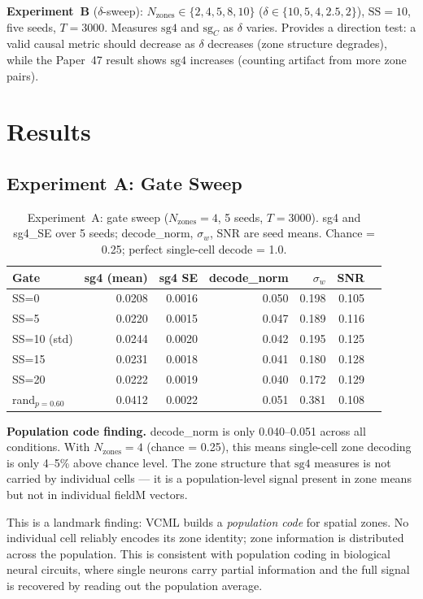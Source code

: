 \documentclass[11pt,a4paper]{article}
\begin{document}
\textbf{Experiment~B} ($\delta$-sweep): $N_\text{zones} \in \{2,4,5,8,10\}$
($\delta \in \{10,5,4,2.5,2\}$), $\mathrm{SS}{=}10$, five seeds, $T=3000$.
Measures $\mathrm{sg4}$ and $\mathrm{sg}_C$ as $\delta$ varies.  Provides a
direction test: a valid causal metric should decrease as $\delta$ decreases
(zone structure degrades), while the Paper~47 result shows $\mathrm{sg4}$
increases (counting artifact from more zone pairs).

\section{Results}

\subsection{Experiment A: Gate Sweep}

\begin{table}[h]
\centering
\caption{Experiment~A: gate sweep ($N_\text{zones}=4$, 5 seeds, $T=3000$).
  sg4 and sg4\_SE over 5 seeds; decode\_norm, $\sigma_w$, SNR are seed means.
  Chance = 0.25; perfect single-cell decode = 1.0.}
\label{tab:expa}
\begin{tabular}{lrrrrrr}
\toprule
Gate & sg4 (mean) & sg4 SE & decode\_norm & $\sigma_w$ & SNR \\
\midrule
SS=0          & 0.0208 & 0.0016 & 0.050 & 0.198 & 0.105 \\
SS=5          & 0.0220 & 0.0015 & 0.047 & 0.189 & 0.116 \\
SS=10 (std)   & 0.0244 & 0.0020 & 0.042 & 0.195 & 0.125 \\
SS=15         & 0.0231 & 0.0018 & 0.041 & 0.180 & 0.128 \\
SS=20         & 0.0222 & 0.0019 & 0.040 & 0.172 & 0.129 \\
rand$_{p=0.60}$ & 0.0412 & 0.0022 & 0.051 & 0.381 & 0.108 \\
\bottomrule
\end{tabular}
\end{table}

\textbf{Population code finding.}  decode\_norm is only 0.040--0.051 across
all conditions.  With $N_\text{zones}=4$ (chance = 0.25), this means single-cell
zone decoding is only 4--5\% above chance level.  The zone structure that
$\mathrm{sg4}$ measures is not carried by individual cells --- it is a
population-level signal present in zone means but not in individual fieldM
vectors.

This is a landmark finding: VCML builds a \emph{population code} for spatial
zones.  No individual cell reliably encodes its zone identity; zone information
is distributed across the population.  This is consistent with population coding
in biological neural circuits, where single neurons carry partial information and
the full signal is recovered by reading out the population average.
\end{document}
